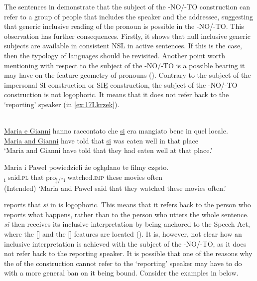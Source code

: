 \documentclass[output=paper]{LSP/langsci}
\begin{document}
The sentences in  demonstrate that the subject of the -NO/-TO construction can refer to a group of people that includes the speaker and the addressee, suggesting that generic inclusive reading of the  pronoun is possible in the -NO/-TO. This observation has further consequences. Firstly, it shows that null inclusive generic subjects are available in consistent NSL in active sentences. If this is the case, then the typology of  languages should be revisited. Another point worth mentioning with respect to the subject of the -NO/-TO is a possible bearing it may have on the feature geometry of pronouns (\citealt{HarleyRitter2002}). Contrary to the subject of the  impersonal SI construction  or  SIĘ construction, the subject of the -NO/-TO construction is not logophoric. It means that it does not refer back to the ‘reporting’ speaker (in \ref{ex:17I.krzek}).

\ea%
\label{ex:16.krzek}
\citep[173]{DAlessandro2007}\\
\gll	 \ul{Maria e Gianni} hanno raccontato che \ul{si} era   mangiato bene in  quel locale.\\
          \ul{Maria and Gianni}  have   told         that  \ul{si}  was  eaten     well  in  that  place\\
\glt ‘Maria and Gianni have told that they had eaten well at that place.’
\z

\ea%
\label{ex:17I.krzek}
\gll	 Maria i       Paweł   powiedzieli że             oglądano        te      filmy      często. \\
[Maria and Paweł]\textsubscript{i} said.\textsc{pl}    {that pro\textsubscript{j/*i}} watched.\textsc{imp}  these movies   often\\
\glt           (Intended) ‘Maria and Paweł said that they watched these movies often.’
\z

\citet{DAlessandro2007} reports that \textit{si} in  is logophoric. This means that it refers back to the person who reports what happens, rather than to the person who utters the whole sentence. \textit{si} then receives its inclusive interpretation by being anchored to the Speech Act, where the [] and the [] features are located (\citealt{DAlessandro2007,Sigurðsson2004,Bianchi2003Tense}). It is, however, not clear how an inclusive interpretation is achieved with the subject of the -NO/-TO, as it does not refer back to the reporting speaker. It is possible that one of the reasons why the  of the  construction cannot refer to the ‘reporting’ speaker may have to do with a more general ban on it being bound. Consider the examples in  below.
\end{document}
